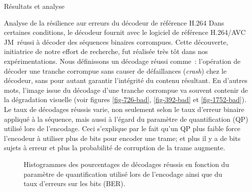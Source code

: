 \documentclass[letterpaper, twoside, 12pt,memoire]{thETS}
\newcommand{\ltCodec}{logiciel de référence H.264/AVC JM}
\newcommand{\ang}[1]{(\textit{#1})}
\begin{document}
\begin{chapter}{Résultats et analyse}
\begin{section}{Analyse de la résilience aur erreurs du décodeur de référence H.264}
\label{sec-ResilienceDecodeur}
Dans certaines conditions, le décodeur fournit avec le \ltCodec~réussi à décoder
des séquences binaires corrompues. Cette découverte, initiatrice de notre effort
de recherche, fut réalisée très tôt dans nos expérimentations.  Nous définissons
un décodage réussi comme~: l'opération de décoder une tranche corrompue sans
causer de défaillances \ang{crash} chez le décodeur, sans pour autant garantir
l'intégrité du contenu résultant. En d'autres mots, l'image issue du décodage
d'une tranche corrompue va souvent contenir de la dégradation visuelle (voir
figures \ref{fig-726-bad}, \ref{fig-392-bad} et \ref{fig-1752-bad}). Le taux de
décodages réussis varie, non seulement selon le taux d'erreur binaire appliqué à
la séquence, mais aussi à l'égard du paramètre de quantification (QP) utilisé
lors de l'encodage. Ceci s'explique par le fait qu'un QP plus faible force
l'encodeur à utiliser plus de bits pour encoder une trame; et plus il y a de
bits sujets à erreur et plus la probabilité de corruption de la trame augmente.

\begin{figure}[htb]
\caption{Histogrammes des pourcentages de décodages réussis en fonction du
paramètre de quantification utilisé lors de l'encodage ainsi que du taux
d'erreurs sur les bits (BER). }
\label{fig-Decodings}
\end{figure}


\end{section}
\end{chapter}
\end{document}

